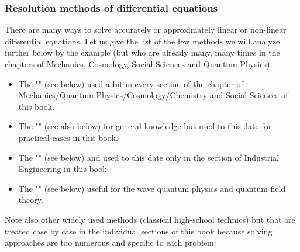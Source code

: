 	\subsubsection{Resolution methods of differential equations}
	There are many ways to solve accurately or approximately linear or non-linear differential equations. Let us give the list of the few methods we will analyze further below by the example (but who are already many, many times in the chapters of Mechanics, Cosmology, Social Sciences and Quantum Physics):
	\begin{itemize}
		\item The "" (see below) used a bit in every section of the chapter of Mechanics/Quantum Physics/Cosmology/Chemistry and Social Sciences of this book.
		
		\item The "" (see also below) for general knowledge but used to this date for practical cases in this book.
		
		\item The "" (see below) and used to this date only in the section of Industrial Engineering in this book.
		
		\item The "" (see below) useful for the wave quantum physics and quantum field theory.
	\end{itemize}
	
	Note also other widely used methods (classical high-school technics) but that are treated case by case in the individual sections of this book because solving approaches are too numerous and specific to each problem:
	
